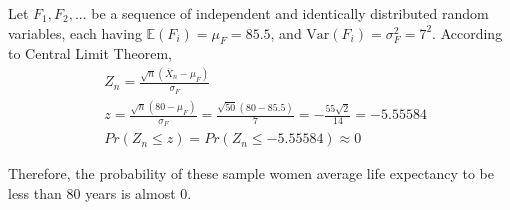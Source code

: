 \documentclass[11pt]{article}
\newcommand{\e}{\mathbb{E}}
\newcommand{\var}{\text{Var}}
\begin{document}
\begin{enumerate}[label=\textbf{Question \arabic*:},start=1]
\begin{enumerate}
  Let $F_1, F_2, ...$ be a sequence of independent and identically distributed random variables, each having $\e(F_i) = \mu_F = 85.5$, and $\var(F_i) = \sigma_F^2 = 7^2$. According to Central Limit Theorem,
  \begin{align*}
   & Z_{n} = \frac{\sqrt{n}(\bar{X}_n - \mu_F)}{\sigma_F} \\
  & z = \frac{\sqrt{n}(80 - \mu_F)}{\sigma_F} = \frac{\sqrt{50} (80 - 85.5)}{7} = - \frac{55\sqrt{2}}{14} = -5.55584 \\
  & Pr(Z_n \leq z) = Pr(Z_n \leq -5.55584) \approx 0
  \end{align*}
  
  Therefore, the probability of these sample women average life expectancy to be less than 80 years is almost 0.\\

\end{enumerate}




\end{enumerate}
\end{document}
